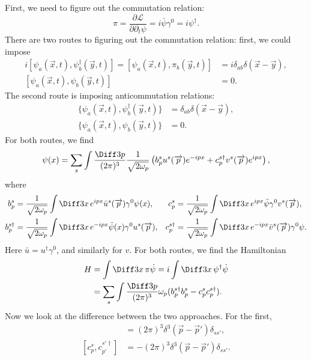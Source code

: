 \documentclass[12pt]{article}
\begin{document}
First, we need to figure out the commutation relation:
\[
\pi = \frac{\partial \mathcal{L}}{\partial \partial_t \psi} = i \bar \psi \gamma^0 = i \psi^{\dagger}.
\]
There are two routes to figuring out the commutation relation: first, we could impose
\begin{align*}
	i [\psi_a(\overrightarrow{x}, t), \psi_b^{\dagger}(\overrightarrow{y}, t)] = [\psi_a(\overrightarrow{x}, t), \pi_b(\overrightarrow{y}, t)] &= i \delta_{ab} \delta(\overrightarrow{x} - \overrightarrow{y}), \\
	[\psi_a(\overrightarrow{x}, t), \psi_b(\overrightarrow{y}, t)] &= 0.
\end{align*}
The second route is imposing anticommutation relations:
\begin{align*}
	\{\psi_a(\overrightarrow x, t), \psi_b^{\dagger}(\overrightarrow y, t)\} &= \delta_{ab}\delta(\overrightarrow{x} - \overrightarrow{y}), \\
	\{\psi_a(\overrightarrow{x}, t), \psi_b(\overrightarrow{y}, t)\} &= 0.
\end{align*}
For both routes, we find
\[
	\psi(x) = \sum_s \int \frac{\Diff 3 p}{(2 \pi)^3} \frac{1}{\sqrt{2 \omega_p}} \left( b_p^s u^{s}(\overrightarrow{p}) e^{-ipx} + c_p^{s\dagger} v^{s}(\overrightarrow{p}) e^{ipx} \right),
\]
where
\begin{align*}
	b^{s}_p &= \frac{1}{\sqrt{2\omega_p}} \int \Diff 3 x \, e^{ipx} \bar u^{s}(\overrightarrow{p})\gamma^{0} \psi(x), & c_p^{s} &= \frac{1}{\sqrt{2 \omega_p}} \int \Diff 3 x \, e^{ipx} \bar \psi \gamma^{0} v^{s} (\overrightarrow{p}), \\
	b_p^{s\dagger} &= \frac{1}{\sqrt{2 \omega_p}} \int \Diff 3 x \, e^{-ipx} \bar \psi(x) \gamma^{0} u^{s}(\overrightarrow{p}), & c_p^{s\dagger} &= \frac{1}{\sqrt{2 \omega_p}} \int \Diff 3 x \, e^{-ipx} \bar v^{s}(\overrightarrow{p}) \gamma^{0} \psi.
\end{align*}
Here $\bar u = u^{\dagger} \gamma^{0}$, and similarly for $v$. For both routes, we find the Hamiltonian
\begin{align*}
	H &= \int \Diff 3 x \, \pi \dot \psi = i \int \Diff 3 x \, \psi^{\dagger} \dot \psi \\
	  &= \sum_s \int \frac{\Diff 3 p}{(2 \pi)^3} \omega_p(b_p^{s\dagger} b_p^{s} - c_p^s c_p^{s\dagger}).
\end{align*}
Now we look at the difference between the two approaches. For the first,
\begin{align*}
	[b_p^{s}, b_{p'}^{s'\dagger}] &= (2\pi)^3 \delta^3(\overrightarrow{p} - \overrightarrow{p}') \delta_{ss'}, \\
	[c_p^{s}, c_{p'}^{s'\dagger}] &= - (2\pi)^3\delta^3(\overrightarrow{p} - \overrightarrow{p}') \delta_{ss'}.
\end{align*}
\end{document}
